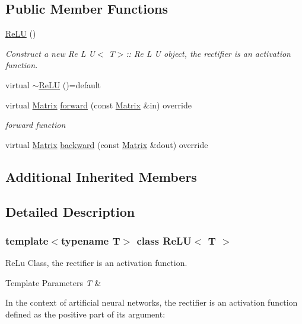 \subsection*{Public Member Functions}
\begin{DoxyCompactItemize}
\item 
\mbox{\hyperlink{class_re_l_u_ad378d979e537b8af65513b3cb9bfe2b1}{Re\+LU}} ()
\begin{DoxyCompactList}\small\item\em Construct a new Re L U$<$ T$>$\+:: Re L U object, the rectifier is an activation function. \end{DoxyCompactList}\item 
virtual \mbox{\hyperlink{class_re_l_u_a6694b0386daea4398ad932f92382e206}{$\sim$\+Re\+LU}} ()=default
\item 
virtual \mbox{\hyperlink{class_re_l_u_a3d1448f06335a4ab7227ec31a43a410f}{Matrix}} \mbox{\hyperlink{class_re_l_u_aef903f5e7d309e76f49abc34043354ce}{forward}} (const \mbox{\hyperlink{class_re_l_u_a3d1448f06335a4ab7227ec31a43a410f}{Matrix}} \&in) override
\begin{DoxyCompactList}\small\item\em forward function \end{DoxyCompactList}\item 
virtual \mbox{\hyperlink{class_re_l_u_a3d1448f06335a4ab7227ec31a43a410f}{Matrix}} \mbox{\hyperlink{class_re_l_u_aa634f43909614b979d84f5d4e5480bb4}{backward}} (const \mbox{\hyperlink{class_re_l_u_a3d1448f06335a4ab7227ec31a43a410f}{Matrix}} \&dout) override
\end{DoxyCompactItemize}
\subsection*{Additional Inherited Members}


\subsection{Detailed Description}
\subsubsection*{template$<$typename T$>$\newline
class Re\+L\+U$<$ T $>$}

Re\+Lu Class, the rectifier is an activation function. 


\begin{DoxyTemplParams}{Template Parameters}
{\em T} & \\
\hline
\end{DoxyTemplParams}
In the context of artificial neural networks, the rectifier is an activation function defined as the positive part of its argument\+:

